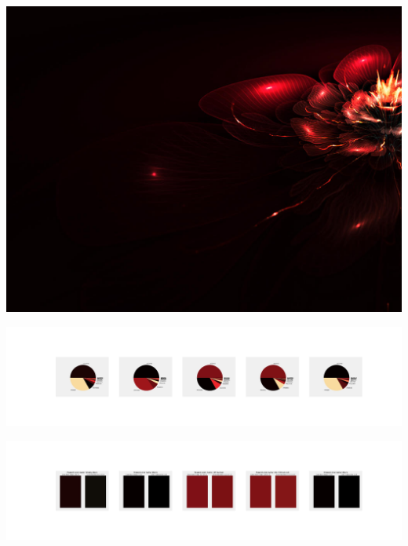 \documentclass[11pt]{article}
\begin{document}
\begin{landscape}
    \begin{center}
    \includegraphics[width=\textwidth]{./nbimg/file (133).jpg}
    \end{center}

    \begin{center}
    \includegraphics[width=250mm]{./nbimg/pie-38.jpg}
    \end{center}

    \begin{center}
    \includegraphics[width=250mm]{./nbimg/peak-38.jpg}
    \end{center}
    


\end{landscape}
\end{document}
